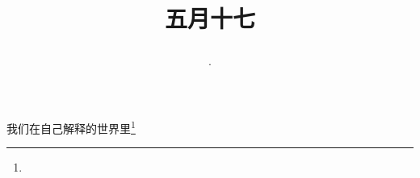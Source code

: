 \title{\date[d=22,m=6,y=2024][year:cn-y,年,month:cn,day:cn,日,·,weekday]·五月十七 }
我们在自己解释的世界里\footnote{ }

